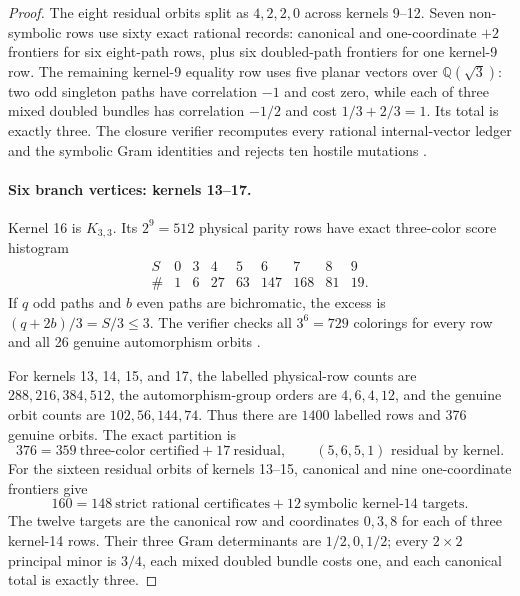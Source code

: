 \documentclass[11pt]{article}
\theoremstyle{remark}
\begin{document}
\begin{proof}
The eight residual orbits split as $4,2,2,0$ across kernels 9--12.  Seven
non-symbolic rows use sixty exact rational records: canonical and
one-coordinate $+2$ frontiers for six eight-path rows, plus six doubled-path
frontiers for one kernel-9 row.  The remaining kernel-9 equality row uses five
planar vectors over $\mathbb Q(\sqrt3)$: two odd singleton paths have
correlation $-1$ and cost zero, while each of three mixed doubled bundles has
correlation $-1/2$ and cost $1/3+2/3=1$.  Its total is exactly three.
The closure verifier recomputes every rational internal-vector ledger and the
symbolic Gram identities and rejects ten hostile mutations
\cite{FiveSieve,FiveClosure}.

\paragraph{Six branch vertices: kernels 13--17.}
Kernel 16 is $K_{3,3}$.  Its $2^9=512$ physical parity rows have exact
three-color score histogram
\[
\begin{array}{c|rrrrrrrr}
S&0&3&4&5&6&7&8&9\\ \hline
\#&1&6&27&63&147&168&81&19.
\end{array}
\]
If $q$ odd paths and $b$ even paths are bichromatic, the excess is
$(q+2b)/3=S/3\leq3$.  The verifier checks all $3^6=729$ colorings for every
row and all 26 genuine automorphism orbits \cite{KernelSixteen}.

For kernels 13, 14, 15, and 17, the labelled physical-row counts are
$288,216,384,512$, the automorphism-group orders are $4,6,4,12$, and the
genuine orbit counts are $102,56,144,74$.  Thus there are $1400$ labelled
rows and 376 genuine orbits.  The exact partition is
\begin{equation}\label{eq:six-sieve}
 376=359\ \text{three-color certified}+17\ \text{residual},
 \qquad (5,6,5,1)\text{ residual by kernel}.
\end{equation}
For the sixteen residual orbits of kernels 13--15, canonical and nine
one-coordinate frontiers give
\begin{equation}\label{eq:six-frontier}
 160=148\ \text{strict rational certificates}
        +12\ \text{symbolic kernel-14 targets}.
\end{equation}
The twelve targets are the canonical row and coordinates $0,3,8$ for each of
three kernel-14 rows.  Their three Gram determinants are $1/2,0,1/2$; every
$2\times2$ principal minor is $3/4$, each mixed doubled bundle costs one, and
each canonical total is exactly three.


\end{proof}
\end{document}
